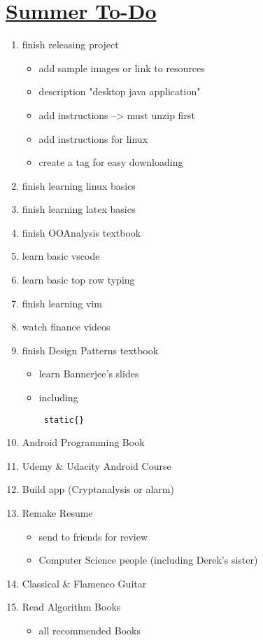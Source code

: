 \documentclass[10pt]{article}
\begin{document}
\section*{\underline{Summer To-Do}}

\begin{enumerate}
    \item finish releasing project
    \begin{itemize}
	    \item add sample images or link to resources
	    \item description "desktop java application"
	    \item add instructions --> must unzip first
	    \item add instructions for linux
	    \item create a tag for easy downloading
    \end{itemize}
    \item finish learning linux basics
    \item finish learning latex basics
    \item finish OOAnalysis textbook
    \item learn basic vscode
    \item learn basic top row typing
    \item finish learning vim
    \item watch finance videos
    \item finish Design Patterns textbook
    \begin{itemize}
            \item learn Bannerjee's slides
            \item including \begin{verbatim} static{} \end{verbatim}
    \end{itemize}
    \item Android Programming Book
    \item Udemy \& Udacity Android Course
    \item Build app (Cryptanalysis or alarm)
    \item Remake Resume
    \begin{itemize}
        \item send to friends for review
        \item Computer Science people (including Derek's sister)
    \end{itemize}
    \item Classical \& Flamenco Guitar
    \item Read Algorithm Books
    \begin{itemize}
        \item all recommended Books
    \end{itemize}

\end{enumerate}
\end{document}
